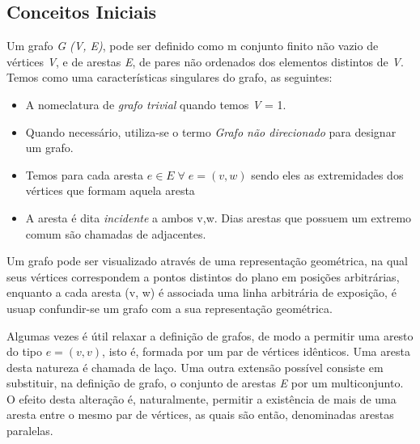 \documentclass[12pt a4paper]{paper}
\begin{document}
\subsection{Conceitos Iniciais}
Um grafo \textit{G (V, E)}, pode ser definido como m conjunto finito não vazio de vértices \textit{V}, e de arestas \textit{E}, de pares não ordenados dos elementos distintos de \textit{V}. Temos como uma características singulares do grafo, as seguintes:
\begin{itemize}
  
  \item A nomeclatura de \textit{grafo trivial} quando temos \textbar \textit{V} \textbar = 1.
  \item Quando necessário, utiliza-se o termo \textit{Grafo não direcionado} para designar um grafo.
  \item Temos para cada aresta $ e \in E \; \forall \; e = (v, w) $ sendo eles as extremidades dos vértices que formam aquela aresta
  \item A aresta é dita \textit{incidente} a ambos v,w. Dias arestas que possuem um extremo comum são chamadas de adjacentes.

\end{itemize}

Um grafo pode ser visualizado através de uma representação geométrica, na qual seus vértices correspondem a pontos distintos do plano em posições arbitrárias, enquanto a cada aresta (v, w) é associada uma linha arbitrária de exposição, é usuap confundir-se um grafo com a sua representação geométrica.\par
Algumas vezes é útil relaxar a definição de grafos, de modo a permitir uma aresto do tipo $e = (v, v)$, isto é, formada por um par de vértices idênticos. Uma aresta desta natureza é chamada de laço. Uma outra extensão possível consiste em substituir, na definição de grafo, o conjunto de arestas \textit{E} por um multiconjunto. O efeito desta alteração é, naturalmente, permitir a existência de mais de uma aresta entre o mesmo par de vértices, as quais são então, denominadas arestas paralelas.\par
\end{document}
